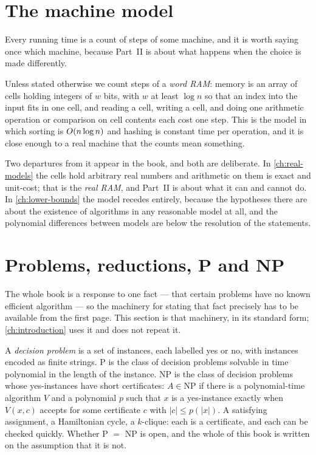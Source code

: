 \section{The machine model}
\label{sec:prelim-machine}

Every running time is a count of steps of some machine, and it is worth saying
once which machine, because Part~II is about what happens when the choice is
made differently.

Unless stated otherwise we count steps of a \emph{word RAM}: memory is an array
of cells holding integers of $w$ bits, with $w$ at least $\log n$ so that an
index into the input fits in one cell, and reading a cell, writing a cell, and
doing one arithmetic operation or comparison on cell contents each cost one
step. This is the model in which sorting is $O\!\left(n \log n\right)$ and hashing is
constant time per operation, and it is close enough to a real machine that the
counts mean something.

Two departures from it appear in the book, and both are deliberate. In
\cref{ch:real-models} the cells hold arbitrary real numbers and arithmetic
on them is exact and unit-cost; that is the \emph{real RAM}, and Part~II is
about what it can and cannot do. In \cref{ch:lower-bounds} the model recedes
entirely, because the hypotheses there are about the existence of algorithms in
any reasonable model at all, and the polynomial differences between models are
below the resolution of the statements.

\section{Problems, reductions, P and NP}
\label{sec:prelim-np}

The whole book is a response to one fact --- that certain problems have no
known efficient algorithm --- so the machinery for stating that fact precisely
has to be available from the first page. This section is that machinery, in its
standard form; \cref{ch:introduction} uses it and does not repeat it.

A \emph{decision problem} is a set of instances, each labelled yes or no, with
instances encoded as finite strings. \textrm{P} is the class of decision
problems solvable in time polynomial in the length of the instance.
\textrm{NP} is the class of decision problems whose yes-instances have short
certificates: $A \in \mathrm{NP}$ if there is a polynomial-time algorithm $V$
and a polynomial $p$ such that $x$ is a yes-instance exactly when
$V(x,c)$ accepts for some certificate $c$ with $|c| \le p(|x|)$. A satisfying
assignment, a Hamiltonian cycle, a $k$-clique: each is a certificate, and each
can be checked quickly. Whether \textrm{P} $=$ \textrm{NP} is open, and the
whole of this book is written on the assumption that it is not.

